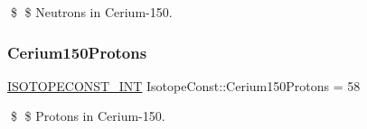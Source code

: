 \$ \$ Neutrons in Cerium-\/150. \mbox{\label{group___isotope_const-_cerium-_ce150_ga89471dacb8a57d0406c247efa7931728}} 
\subsubsection{\texorpdfstring{Cerium150\+Protons}{Cerium150Protons}}
{\footnotesize\ttfamily \mbox{\hyperlink{group___isotope_const-_macros_ga5f18360b3e99483a35c32d789e62621c}{I\+S\+O\+T\+O\+P\+E\+C\+O\+N\+S\+T\+\_\+\+I\+NT}} Isotope\+Const\+::\+Cerium150\+Protons = 58}

\$ \$ Protons in Cerium-\/150. 